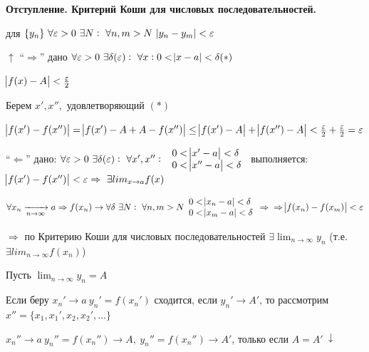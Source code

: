 \documentclass{article}
\begin{document}
\begin{enumerate}
      \textbf{Отступление. Критерий Коши для числовых последовательностей.}
      
      для \(\{y_n\}\ \forall \varepsilon > 0\ \exists N:\ \forall n, m > N\ \abs{y_n - y_m} < \varepsilon\)
  
      \( \uparrow \) ``\(\Rightarrow\)'' дано \( \forall \varepsilon > 0\ \exists \delta(\varepsilon):\ \forall x: 0 < \abs{x - a} < \delta (*)\)

      \( \abs{f(x) - A} < \frac{\varepsilon}{2} \)
      
      Берем \( x',x'',\) удовлетворяющий $(*)$

      \( \abs{f(x') - f(x'')} = \abs{f(x') - A + A - f(x'')} \leq \abs{f(x') - A} + \abs{f(x'') - A} < \frac{\varepsilon}{2} + \frac{\varepsilon}{2} = \varepsilon \)

      ``\(\Leftarrow\)'' дано: \(\forall \varepsilon > 0\ \exists \delta(\varepsilon):\ \forall x',x'':\ \begin{array}{l}0 < \abs{x' - a} < \delta\\ 0 < \abs{x'' - a} < \delta\end{array}\) выполняется:\\
      \(\abs{f(x')-f(x'')} < \varepsilon \Rightarrow\ \exists lim_{x \rightarrow a} f(x)\)

      \(\forall x_n \xrightarrow[n \rightarrow \infty]{} a \Rightarrow f(x_n) \rightarrow \forall \delta\ \exists N:\ \forall n,m > N \begin{array}{l}0 < \abs{x_n - a} < \delta\\ 0 < \abs{x_m - a} < \delta \end{array} \Rightarrow\\
      \Rightarrow \abs{f(x_n)-f(x_m)}< \varepsilon\)
      
      \(\Rightarrow\) по Критерию Коши для числовых последовательностей \(\exists \lim_{n \rightarrow \infty} y_n\) (т.е. \(\exists lim_{n \rightarrow \infty} f(x_n)\))
            
      Пусть \( \lim_{n \rightarrow \infty} y_n = A \)

      Если беру \( x_n' \rightarrow a\ y_n' = f(x_n')\) сходится, если \( y_n' \rightarrow A' \), то рассмотрим \(x'' = \{x_1, x_1', x_2, x_2', ...\} \)

      \( x_n'' \rightarrow a\ y_n'' = f(x_n'') \rightarrow A,\ y_n'' = f(x_n'') \rightarrow A'\), только если \( A = A'\ \downarrow \)

  \end{enumerate}
\end{document}
